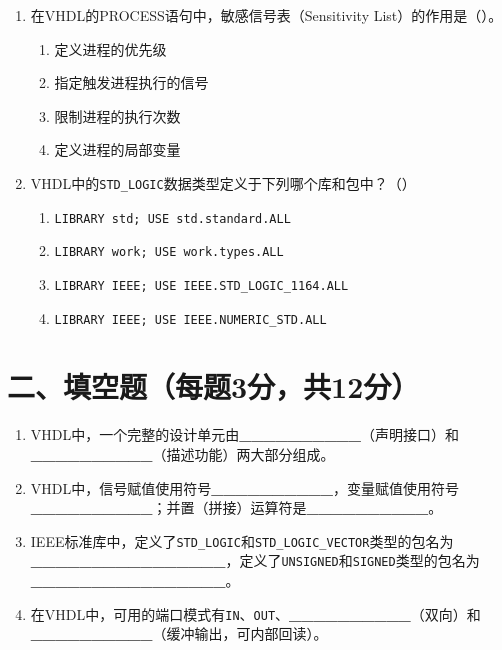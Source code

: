 \begin{enumerate}[label=\arabic*.]
\item 在VHDL的PROCESS语句中，敏感信号表（Sensitivity List）的作用是（\quad）。

\begin{enumerate}[label=\Alph*.]
  \item 定义进程的优先级
  \item 指定触发进程执行的信号
  \item 限制进程的执行次数
  \item 定义进程的局部变量
\end{enumerate}

\item VHDL中的\texttt{STD\_LOGIC}数据类型定义于下列哪个库和包中？（\quad）

\begin{enumerate}[label=\Alph*.]
  \item \texttt{LIBRARY std; USE std.standard.ALL}
  \item \texttt{LIBRARY work; USE work.types.ALL}
  \item \texttt{LIBRARY IEEE; USE IEEE.STD\_LOGIC\_1164.ALL}
  \item \texttt{LIBRARY IEEE; USE IEEE.NUMERIC\_STD.ALL}
\end{enumerate}

\end{enumerate}

\newpage

\section*{二、填空题（每题3分，共12分）}

\begin{enumerate}[label=\arabic*.]

\item VHDL中，一个完整的设计单元由\textbf{\_\_\_\_\_\_\_\_\_\_}（声明接口）和\textbf{\_\_\_\_\_\_\_\_\_\_}（描述功能）两大部分组成。

\item VHDL中，信号赋值使用符号\textbf{\_\_\_\_\_\_\_\_\_\_}，变量赋值使用符号\textbf{\_\_\_\_\_\_\_\_\_\_}；并置（拼接）运算符是\textbf{\_\_\_\_\_\_\_\_\_\_}。

\item IEEE标准库中，定义了\texttt{STD\_LOGIC}和\texttt{STD\_LOGIC\_VECTOR}类型的包名为\textbf{\_\_\_\_\_\_\_\_\_\_\_\_\_\_\_\_}，定义了\texttt{UNSIGNED}和\texttt{SIGNED}类型的包名为\textbf{\_\_\_\_\_\_\_\_\_\_\_\_\_\_\_\_}。

\item 在VHDL中，可用的端口模式有\texttt{IN}、\texttt{OUT}、\textbf{\_\_\_\_\_\_\_\_\_\_}（双向）和\textbf{\_\_\_\_\_\_\_\_\_\_}（缓冲输出，可内部回读）。

\end{enumerate}

